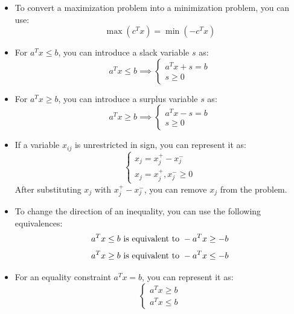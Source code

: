\documentclass[12pt, a4paper]{report}
\begin{document}
    \begin{itemize}
        \item To convert a maximization problem into a minimization problem, you can use: 
            \[\max{(c^Tx)}=\min{(-c^Tx)}\]
        \item For $a^Tx \leq b$, you can introduce a slack variable $s$ as: 
            \[a^Tx \leq b \implies
            \begin{cases}
                a^Tx+s=b \\
                s \geq 0
            \end{cases}
            \]
        \item For $a^Tx \geq b$, you can introduce a surplus variable $s$ as: 
            \[a^Tx \geq b \implies 
            \begin{cases}
                a^Tx-s=b \\
                s \geq 0
            \end{cases}
            \]
        \item If a variable $x_{ij}$ is unrestricted in sign, you can represent it as:
            \[\begin{cases}
                x_j=x_j^{+}-x_j^{-} \\
                x_j=x_j^{+},x_j^{-} \geq 0
            \end{cases}
            \]
            After substituting $x_j$ with $x_j^{+}-x_j^{-}$, you can remove $x_j$ from the problem. 
        \item To change the direction of an inequality, you can use the following equivalences:
            \[a^Tx \leq b \textnormal{ is equivalent to } -a^Tx \geq -b\]
            \[a^Tx \geq b \textnormal{ is equivalent to } -a^Tx \leq -b\]
        \item For an equality constraint $a^Tx = b$, you can represent it as:
            \[
            \begin{cases}
                a^Tx \geq b \\
                a^Tx \leq b
            \end{cases}
            \]
    \end{itemize}
\end{document}
